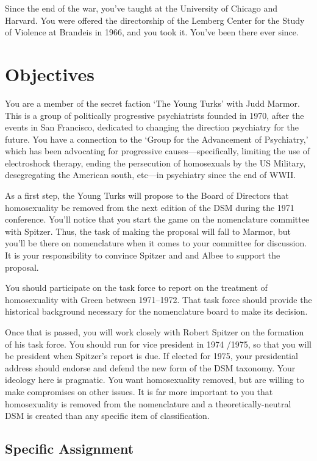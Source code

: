 \begin{refsection}
Since the end of the war, you've taught at the University of Chicago and Harvard. You were offered the directorship of the Lemberg Center for the Study of Violence at Brandeis in 1966, and you took it. You've been there ever since.

\section{Objectives}
\label{objectives}

You are a member of the secret faction `The Young Turks' with Judd Marmor. This is a group of politically progressive psychiatrists founded in 1970, after the events in San Francisco, dedicated to changing the direction psychiatry for the future. You have a connection to the `Group for the Advancement of Psychiatry,' which has been advocating for progressive causes—specifically, limiting the use of electroshock therapy, ending the persecution of homosexuals by the US Military, desegregating the American south, etc—in psychiatry since the end of WWII. 

As a first step, the Young Turks will propose to the Board of Directors that homosexuality be removed from the next edition of the DSM during the 1971 conference. You'll notice that you start the game on the nomenclature committee with Spitzer. Thus, the task of making the proposal will fall to Marmor, but you'll be there on nomenclature when it comes to your committee for discussion. It is your responsibility to convince Spitzer and and Albee to support the proposal.

You should participate on the task force to report on the treatment of homosexuality with Green between 1971--1972. That task force should provide the historical background necessary for the nomenclature board to make its decision.

Once that is passed, you will work closely with Robert Spitzer on the formation of his task force. You should run for vice president in 1974 \slash  1975, so that you will be president when Spitzer's report is due. If elected for 1975, your presidential address should endorse and defend the new form of the DSM taxonomy. Your ideology here is pragmatic. You want homosexuality removed, but are willing to make compromises on other issues. It is far more important to you that homosexuality is removed from the nomenclature and a theoretically-neutral DSM is created than any specific item of classification.

\subsection{Specific Assignment}
\label{specificassignment}


\end{refsection}
